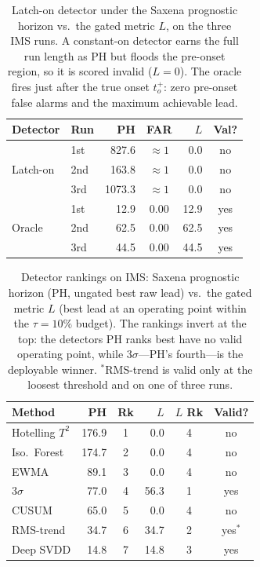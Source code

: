\documentclass[IJPHM, 2026, 0]{PHMSociety}
\begin{document}
\begin{table}[t] \small
	\begin{center}
	\caption{Latch-on detector under the Saxena prognostic horizon vs.\ the gated metric $L$, on the three IMS runs. A constant-on detector earns the full run length as PH but floods the pre-onset region, so it is scored invalid ($L=0$). The oracle fires just after the true onset $t_o^+$: zero pre-onset false alarms and the maximum achievable lead.}
	\label{tab:latchon}
	\begin{tabular}{l l r c r c}
		\hline \hline
		\textbf{Detector} & \textbf{Run} & \textbf{PH} & \textbf{FAR} & \textbf{$L$} & \textbf{Val?} \\
		\hline
		\multirow{3}{*}{Latch-on} & 1st & 827.6 & ${\approx}1$ & 0.0 & no \\
		 & 2nd & 163.8 & ${\approx}1$ & 0.0 & no \\
		 & 3rd & 1073.3 & ${\approx}1$ & 0.0 & no \\
		\hline
		\multirow{3}{*}{Oracle} & 1st & 12.9 & 0.00 & 12.9 & yes \\
		 & 2nd & 62.5 & 0.00 & 62.5 & yes \\
		 & 3rd & 44.5 & 0.00 & 44.5 & yes \\
		\hline \hline
	\end{tabular}
	\end{center}
\end{table}

\begin{table}[t] \small
	\begin{center}
	\caption{Detector rankings on IMS: Saxena prognostic horizon (PH, ungated best raw lead) vs.\ the gated metric $L$ (best lead at an operating point within the $\tau=10\%$ budget). The rankings invert at the top: the detectors PH ranks best have no valid operating point, while $3\sigma$---PH's fourth---is the deployable winner. $^*$RMS-trend is valid only at the loosest threshold and on one of three runs.}
	\label{tab:phrank}
	\begin{tabular}{l r c r c c}
		\hline \hline
		\textbf{Method} & \textbf{PH} & \textbf{Rk} & \textbf{$L$} & \textbf{$L$ Rk} & \textbf{Valid?} \\
		\hline
		Hotelling $T^2$ & 176.9 & 1 & 0.0 & 4 & no \\
		Iso.\ Forest & 174.7 & 2 & 0.0 & 4 & no \\
		EWMA & 89.1 & 3 & 0.0 & 4 & no \\
		$3\sigma$ & 77.0 & 4 & 56.3 & 1 & yes \\
		CUSUM & 65.0 & 5 & 0.0 & 4 & no \\
		RMS-trend & 34.7 & 6 & 34.7 & 2 & yes$^*$ \\
		Deep SVDD & 14.8 & 7 & 14.8 & 3 & yes \\
		\hline \hline
	\end{tabular}
	\end{center}
\end{table}
\end{document}
